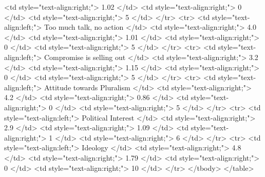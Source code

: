    <td style="text-align:right;"> 1.02 </td>
   <td style="text-align:right;"> 0 </td>
   <td style="text-align:right;"> 5 </td>
  </tr>
  <tr>
   <td style="text-align:left;"> Too much talk, no action </td>
   <td style="text-align:right;"> 4.0 </td>
   <td style="text-align:right;"> 1.01 </td>
   <td style="text-align:right;"> 0 </td>
   <td style="text-align:right;"> 5 </td>
  </tr>
  <tr>
   <td style="text-align:left;"> Compromise is selling out </td>
   <td style="text-align:right;"> 3.2 </td>
   <td style="text-align:right;"> 1.15 </td>
   <td style="text-align:right;"> 0 </td>
   <td style="text-align:right;"> 5 </td>
  </tr>
  <tr>
   <td style="text-align:left;"> Attitude towards Pluralism </td>
   <td style="text-align:right;"> 4.2 </td>
   <td style="text-align:right;"> 0.86 </td>
   <td style="text-align:right;"> 0 </td>
   <td style="text-align:right;"> 5 </td>
  </tr>
  <tr>
   <td style="text-align:left;"> Political Interest </td>
   <td style="text-align:right;"> 2.9 </td>
   <td style="text-align:right;"> 1.09 </td>
   <td style="text-align:right;"> 1 </td>
   <td style="text-align:right;"> 6 </td>
  </tr>
  <tr>
   <td style="text-align:left;"> Ideology </td>
   <td style="text-align:right;"> 4.8 </td>
   <td style="text-align:right;"> 1.79 </td>
   <td style="text-align:right;"> 0 </td>
   <td style="text-align:right;"> 10 </td>
  </tr>
</tbody>
</table>
